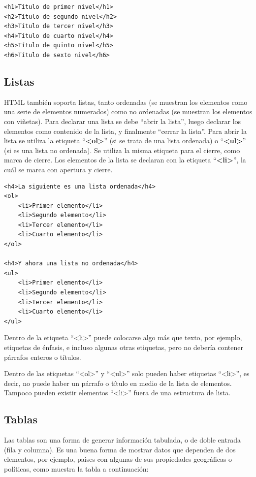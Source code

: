 \begin{lstlisting}[language=XHTML]
<h1>Título de primer nivel</h1>
<h2>Título de segundo nivel</h2>
<h3>Título de tercer nivel</h3>
<h4>Título de cuarto nivel</h4>
<h5>Título de quinto nivel</h5>
<h6>Título de sexto nivel</h6>
\end{lstlisting}

\subsection*{Listas}

HTML también soporta listas, tanto ordenadas (se muestran los elementos como una
serie de elementos numerados) como no ordenadas (se muestran los elementos con
viñetas). Para declarar una lista se debe ``abrir la lista'', luego declarar los
elementos como contenido de la lista, y finalmente ``cerrar la lista''. Para
abrir la lista se utiliza la etiqueta ``\textbf{<ol>}'' (si se trata de una
lista ordenada) o ``\textbf{<ul>}'' (si es una lista no ordenada). Se utiliza la
misma etiqueta para el cierre, como marca de cierre. Los elementos de la lista
se declaran con la etiqueta ``\textbf{<li>}'', la cuál se marca con apertura y
cierre.

\begin{lstlisting}[language=XHTML]
<h4>La siguiente es una lista ordenada</h4>
<ol>
    <li>Primer elemento</li>
    <li>Segundo elemento</li>
    <li>Tercer elemento</li>
    <li>Cuarto elemento</li>
</ol>

<h4>Y ahora una lista no ordenada</h4>
<ul>
    <li>Primer elemento</li>
    <li>Segundo elemento</li>
    <li>Tercer elemento</li>
    <li>Cuarto elemento</li>
</ul>
\end{lstlisting}

Dentro de la etiqueta ``<li>'' puede colocarse algo más que texto, por ejemplo,
etiquetas de énfasis, e incluso algunas otras etiquetas, pero no debería contener
párrafos enteros o títulos.

Dentro de las etiquetas ``<ol>'' y ``<ul>'' solo pueden haber etiquetas
``<li>'', es decir, no puede haber un párrafo o título en medio de la lista de
elementos. Tampoco pueden existir elementos ``<li>'' fuera de una estructura de
lista.

\subsection*{Tablas}

Las tablas son una forma de generar información tabulada, o de doble entrada
(fila y columna). Es una buena forma de mostrar datos que dependen de dos
elementos, por ejemplo, paises con algunas de sus propiedades geográficas o
políticas, como muestra la tabla a continuación:

